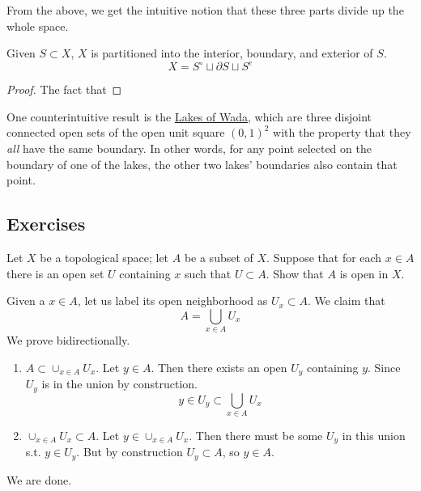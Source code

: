   From the above, we get the intuitive notion that these three parts divide up the whole space. 

  \begin{theorem}
    Given $S \subset X$, $X$ is partitioned into the interior, boundary, and exterior of $S$. 
    \begin{equation}
      X = S^\circ \sqcup \partial S \sqcup S^e
    \end{equation}
  \end{theorem}
  \begin{proof}
    The fact that 
  \end{proof}

  One counterintuitive result is the \href{https://en.wikipedia.org/wiki/Lakes_of_Wada}{Lakes of Wada}, which are three disjoint connected open sets of the open unit square $(0, 1)^2$ with the property that they \textit{all} have the same boundary. In other words, for any point selected on the boundary of one of the lakes, the other two lakes' boundaries also contain that point. 

\subsection{Exercises} 

  \begin{exercise}[Munkres 13.1]
    Let $X$ be a topological space; let $A$ be a subset of $X$. Suppose that for each $x \in A$ there is an open set $U$ containing $x$ such that $U \subset A$. Show that $A$ is open in $X$.
  \end{exercise}
  \begin{solution}[Munkres 13.1]
    Given a $x \in A$, let us label its open neighborhood as $U_x \subset A$. We claim that 
    \begin{equation}
      A = \bigcup_{x \in A} U_x
    \end{equation} 
    We prove bidirectionally. 
    \begin{enumerate}
      \item $A \subset \cup_{x \in A} U_x$. Let $y \in A$. Then there exists an open $U_y$ containing $y$. Since $U_y$ is in the union by construction. 
      \begin{equation}
        y \in U_y \subset \bigcup_{x \in A} U_x
      \end{equation}
      \item $\cup_{x \in A} U_x \subset A$. Let $y \in \cup_{x \in A} U_x$. Then there must be some $U_y$ in this union s.t. $y \in U_y$. But by construction $U_y \subset A$, so $y \in A$. 
    \end{enumerate}
    We are done. 
  \end{solution}

